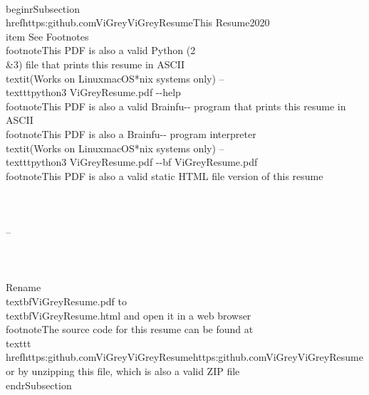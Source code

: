 \\begin{rSubsection}{\\href{https:\/\/github.com\/ViGrey\/ViGreyResume}{This Resume}}{2020}{}{}\n\\item See Footnotes\n  \\footnote{This PDF is also a valid Python (2\\\&3) file that prints this resume in ASCII \\textit{(Works on Linux\/macOS\/*nix systems only)} -- \\texttt{python3 ViGreyResume.pdf -{}-help}}\n	\\footnote{This PDF is also a valid Brainfu-{}- program that prints this resume in ASCII}\n  \\footnote{This PDF is also a Brainfu-{}- program interpreter \\textit{(Works on Linux\/macOS\/*nix systems only)} -- \\texttt{python3 ViGreyResume.pdf -{}-bf ViGreyResume.pdf}}\n	\\footnote{This PDF is also a valid static HTML file version of this resume  \\ \\ \\ \\ -- \\ \\ \\ \\  Rename \\textbf{ViGreyResume.pdf} to \\textbf{ViGreyResume.html} and open it in a web browser}\n	\\footnote{The source code for this resume can be found at \\texttt{\\href{https:\/\/github.com\/ViGrey\/ViGreyResume}{https:\/\/github.com\/ViGrey\/ViGreyResume}} or by unzipping this file, which is also a valid ZIP file}\n\\end{rSubsection}\n
